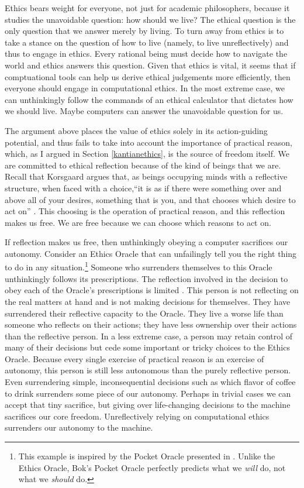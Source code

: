 \begin{isabellebody}
\begin{isamarkuptext}
Ethics bears weight for everyone, not just for academic philosophers, because it studies the unavoidable question:
how should we live? The ethical question is the only question that 
we answer merely by living. To turn away from ethics is to take a stance on the question of how to 
live (namely, to live unreflectively) and thus to engage in ethics. Every rational being must decide 
how to navigate the world and ethics answers this question. Given that ethics is vital, it seems that if
comptuational tools can help us derive ethical judgements more efficiently, then everyone should engage
in computational ethics. In the most extreme case, we can unthinkingly follow the commands of an 
ethical calculator that dictates how we should live. Maybe computers can answer the unavoidable question for us.

The argument above places the value of ethics solely in its action-guiding potential, and thus fails to take into account the 
importance of practical reason, which, as I argued in Section \ref{kantianethics}, is the source
of freedom itself. We are committed to ethical reflection because of the kind of beings that we are. 
Recall that Korsgaard argues that, as beings occupying minds with a reflective structure, when faced with 
a choice,``it is as if there were something over and above all of your desires, something that is you, and that chooses which desire 
to act on'' \citep[83]{sources}. This choosing is the operation of practical reason, and this reflection
makes us free. We are free because we can choose which reasons to act on. 

If reflection makes us free, then unthinkingly obeying a computer sacrifices our autonomy. Consider 
an Ethics Oracle that can unfailingly tell you the right thing to do in any 
situation.\footnote{This example is inspired by the Pocket Oracle presented in \citet{bok}. Unlike the
Ethics Oracle, Bok's Pocket Oracle perfectly predicts what we \emph{will} do, not what we \emph{should} do.} Someone 
who surrenders themselves to this Oracle unthinkingly follows its prescriptions. 
The reflection involved in the decision to obey each of the Oracle’s prescriptions is limited \citep{bok}. 
This person is not reflecting on the real matters at hand and is 
not making decisions for themselves. They have surrendered their reflective capacity to the Oracle. 
They live a worse life than someone who reflects on their actions; they have less ownership over their 
actions than the reflective person. In a less extreme case, a person may retain control of many of 
their decisions but cede some important or tricky choices to the Ethics Oracle. Because every single 
exercise of practical reason is an exercise of autonomy, this person is still less autonomous than the 
purely reflective person. Even surrendering simple, inconsequential decisions such as which flavor of 
coffee to drink surrenders some piece of our autonomy. Perhaps in trivial cases we can accept that 
tiny sacrifice, but giving over life-changing decisions to the machine sacrifices our 
core freedom. Unreflectively relying on computational ethics surrenders our autonomy to the machine. 


\end{isamarkuptext}
\end{isabellebody}
